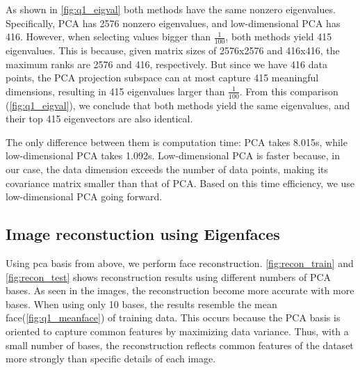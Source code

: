 As shown in \cref{fig:q1_eigval} both methods have the same nonzero eigenvalues. Specifically, PCA has 2576 nonzero eigenvalues, and low-dimensional PCA has 416. However, when selecting values bigger than $\frac{1}{100}$, both methods yield 415 eigenvalues. This is because, given matrix sizes of 2576x2576 and 416x416, the maximum ranks are 2576 and 416, respectively. But since we have 416 data points, the PCA projection subspace can at most capture 415 meaningful dimensions, resulting in 415 eigenvalues larger than $\frac{1}{100}$. From this comparison (\cref{fig:q1_eigval}), we conclude that both methods yield the same eigenvalues, and their top 415 eigenvectors are also identical.

The only difference between them is computation time: PCA takes 8.015s, while low-dimensional PCA takes 1.092s. Low-dimensional PCA is faster because, in our case, the data dimension exceeds the number of data points, making its covariance matrix smaller than that of PCA. Based on this time efficiency, we use low-dimensional PCA going forward. %


\subsection{Image reconstuction using Eigenfaces}
Using pca basis from above, we perform face reconstruction. \cref{fig:recon_train} and \cref{fig:recon_test} shows reconstruction results using different numbers of PCA bases. As seen in the images, the reconstruction become more accurate with more bases. When using only 10 bases, the results resemble the mean face(\cref{fig:q1_meanface}) of training data. This occurs because the PCA basis is oriented to capture common features by maximizing data variance. Thus, with a small number of bases, the reconstruction reflects common features of the dataset more strongly than specific details of each image.

